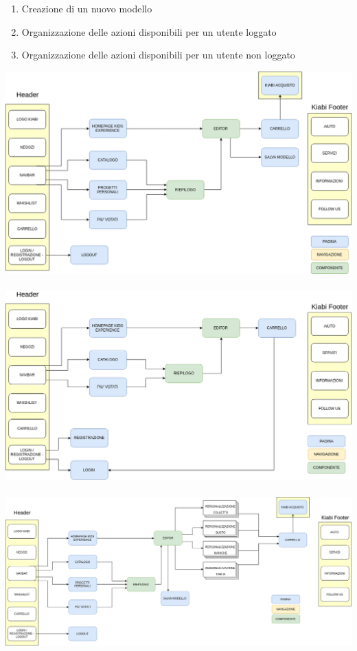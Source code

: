 \documentclass[12pt,italian,]{report}
\providecommand{\tightlist}{%
  \setlength{\itemsep}{0pt}\setlength{\parskip}{0pt}}
\begin{document}
\begin{enumerate}
\def\labelenumi{\arabic{enumi}.}
\tightlist
\item
  Creazione di un nuovo modello
\item
  Organizzazione delle azioni disponibili per un utente loggato
\item
  Organizzazione delle azioni disponibili per un utente non loggato
\end{enumerate}
\includegraphics{blueprints/Utente_loggato.png}
\\
\\
\includegraphics{blueprints/Utente_non_loggato.png}
\\
\\
\includegraphics{blueprints/Creazione_modello.png}
\end{document}

